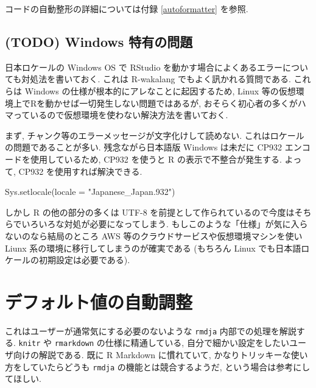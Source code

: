 \documentclass[
  xelatex,ja=standard,jafont=noto]{bxjsbook}
\newenvironment{Shaded}{\begin{snugshade}}{\end{snugshade}}
\newcommand{\AttributeTok}[1]{\textcolor[rgb]{0.77,0.63,0.00}{#1}}
\newcommand{\FunctionTok}[1]{\textcolor[rgb]{0.00,0.00,0.00}{#1}}
\newcommand{\NormalTok}[1]{#1}
\newcommand{\StringTok}[1]{\textcolor[rgb]{0.31,0.60,0.02}{#1}}
\theoremstyle{definition}
\theoremstyle{definition}
\theoremstyle{definition}
\theoremstyle{definition}
\theoremstyle{remark}
\begin{document}
コードの自動整形の詳細については付録 \ref{autoformatter} を参照.

\hypertarget{todo-windows-ux7279ux6709ux306eux554fux984c}{%
\section{(TODO) Windows
特有の問題}\label{todo-windows-ux7279ux6709ux306eux554fux984c}}

日本ロケールの Windows OS で RStudio
を動かす場合によくあるエラーについても対処法を書いておく. これは
R-wakalang でもよく訊かれる質問である. これらは Windows
の仕様が根本的にアレなことに起因するため, Linux
等の仮想環境上でRを動かせば一切発生しない問題ではあるが,
おそらく初心者の多くがハマっているので仮想環境を使わない解決方法を書いておく.

まず, チャンク等のエラーメッセージが文字化けして読めない.
これはロケールの問題であることが多い. 残念ながら日本語版 Windows
は未だに CP932 エンコードを使用しているため, CP932 を使うと R
の表示で不整合が発生する. よって, CP932 を使用すれば解決できる.

\begin{Shaded}
\begin{Highlighting}[numbers=left,,]
\FunctionTok{Sys.setlocale}\NormalTok{(}\AttributeTok{locale =} \StringTok{"Japanese\_Japan.932"}\NormalTok{)}
\end{Highlighting}
\end{Shaded}

しかし R の他の部分の多くは UTF-8
を前提として作られているので今度はそちらでいろいろな対処が必要になってしまう.
もしこのような「仕様」が気に入らないのなら結局のところ AWS
等のクラウドサービスや仮想環境マシンを使い Liunx
系の環境に移行してしまうのが確実である (もちろん Linux
でも日本語ロケールの初期設定は必要である).

\hypertarget{appendix-ux88dcux907a}{%
\appendix}


\hypertarget{default-property}{%
\chapter{デフォルト値の自動調整}\label{default-property}}

これはユーザーが通常気にする必要のないような \texttt{rmdja}
内部での処理を解説する. \texttt{knitr} や \texttt{rmarkdown}
の仕様に精通している, 自分で細かい設定をしたいユーザ向けの解説である.
既に R Markdown に慣れていて, かなりトリッキーな使い方をしていたらどうも
\texttt{rmdja} の機能とは競合するようだ, という場合は参考にしてほしい.
\end{document}
